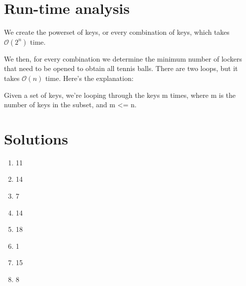 \documentclass{article}
\begin{document}
\section*{Run-time analysis}
We create the powerset of keys, or every combination of keys, which takes
$\mathcal{O}(2^n)$ time.

We then, for every combination we determine the minimum number of lockers
that need to be opened to obtain all tennis balls. There are two loops, but
it takes $\mathcal{O}(n)$ time. Here's the explanation:

Given a set of keys, we're looping through the keys m times, where m is the
number of keys in the subset, and m <= n. 

\section*{Solutions}
\begin{enumerate}
\setlength{\itemsep}{1pt}
\item 11
\item 14
\item 7
\item 14
\item 18
\item 1
\item 15
\item 8
\end{enumerate}
\end{document}
